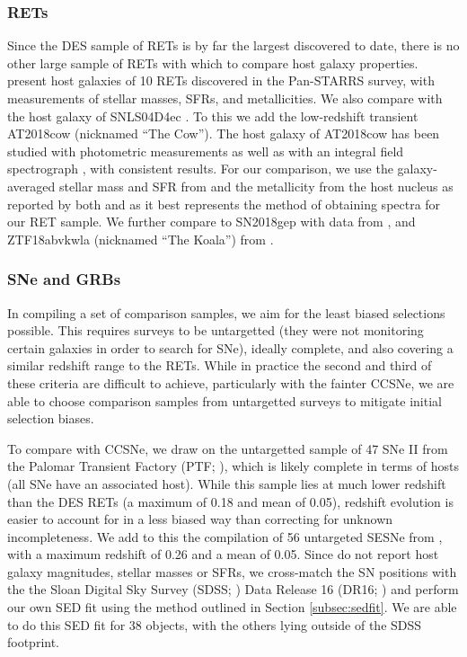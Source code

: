 \documentclass[fleqn,usenatbib,]{mnras}
\begin{document}
\subsubsection{RETs \label{subsubsec:compare_rets}}
Since the DES sample of RETs is by far the largest discovered to date, there is no other large sample of RETs with which to compare host galaxy properties. \citet{Drout2014} present host galaxies of 10 RETs discovered in the Pan-STARRS survey, with measurements of stellar masses, SFRs, and metallicities. We also compare with the host galaxy of SNLS04D4ec \citep{Arcavi2016}. To this we add the low-redshift transient AT2018cow (nicknamed ``The Cow''). The host galaxy of AT2018cow has been studied with photometric measurements \citep{Perley2019} as well as with an integral field spectrograph \citep{Lyman2020}, with consistent results. For our comparison, we use the galaxy-averaged stellar mass and SFR from \citet{Lyman2020} and the metallicity from the host nucleus as reported by both \citet{Morokuma-Matsui2019} and \citet{Lyman2020} as it best represents the method of obtaining spectra for our RET sample. We further compare to SN2018gep with data from  \citet{Ho2019}, and ZTF18abvkwla (nicknamed ``The Koala'') from \citet{Ho2020}.

\subsubsection{SNe and GRBs \label{subsubsec:compare_CCSNe}}

In compiling a set of comparison samples, we aim for the least biased selections possible. This requires surveys to be untargetted (they were not monitoring certain galaxies in order to search for SNe), ideally complete, and also covering a similar redshift range to the RETs. While in practice the second and third of these criteria are difficult to achieve, particularly with the fainter CCSNe, we are able to choose comparison samples from untargetted surveys to mitigate initial selection biases.

To compare with CCSNe, we draw on the untargetted sample of 47 SNe II from the Palomar Transient Factory (PTF; \citealt{Stoll2013}), which is likely complete in terms of hosts (all SNe have an associated host). While this sample lies at much lower redshift than the DES RETs (a maximum of 0.18 and mean of 0.05), redshift evolution is easier to account for in a less biased way than correcting for unknown incompleteness. We add to this the compilation of 56 untargeted SESNe from \citet{Sanders2012}, with a maximum redshift of 0.26 and a mean of 0.05. Since \citet{Sanders2012} do not report host galaxy magnitudes, stellar masses or SFRs, we cross-match the SN positions with the the Sloan Digital Sky Survey (SDSS; \citealt{York2000}) Data Release 16 (DR16; \citealt{Ahumada2019}) and perform our own SED fit using the method outlined in Section \ref{subsec:sedfit}. We are able to do this SED fit for 38 objects, with the others lying outside of the SDSS footprint.
\end{document}
